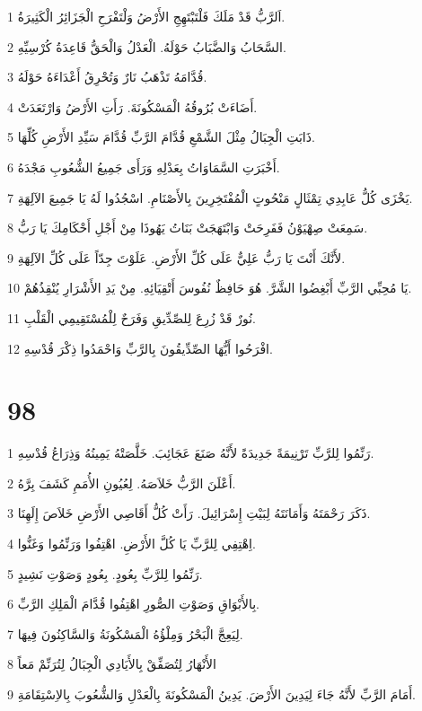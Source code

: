 \par 1 اَلرَّبُّ قَدْ مَلَكَ فَلْتَبْتَهِجِ الأَرْضُ وَلْتَفْرَحِ الْجَزَائِرُ الْكَثِيرَةُ.
\par 2 السَّحَابُ وَالضَّبَابُ حَوْلَهُ. الْعَدْلُ وَالْحَقُّ قَاعِدَةُ كُرْسِيِّهِ.
\par 3 قُدَّامَهُ تَذْهَبُ نَارٌ وَتُحْرِقُ أَعْدَاءَهُ حَوْلَهُ.
\par 4 أَضَاءَتْ بُرُوقُهُ الْمَسْكُونَةَ. رَأَتِ الأَرْضُ وَارْتَعَدَتْ.
\par 5 ذَابَتِ الْجِبَالُ مِثْلَ الشَّمْعِ قُدَّامَ الرَّبِّ قُدَّامَ سَيِّدِ الأَرْضِ كُلِّهَا.
\par 6 أَخْبَرَتِ السَّمَاوَاتُ بِعَدْلِهِ وَرَأَى جَمِيعُ الشُّعُوبِ مَجْدَهُ.
\par 7 يَخْزَى كُلُّ عَابِدِي تِمْثَالٍ مَنْحُوتٍ الْمُفْتَخِرِينَ بِالأَصْنَامِ. اسْجُدُوا لَهُ يَا جَمِيعَ الآلِهَةِ.
\par 8 سَمِعَتْ صِهْيَوْنُ فَفَرِحَتْ وَابْتَهَجَتْ بَنَاتُ يَهُوذَا مِنْ أَجْلِ أَحْكَامِكَ يَا رَبُّ.
\par 9 لأَنَّكَ أَنْتَ يَا رَبُّ عَلِيٌّ عَلَى كُلِّ الأَرْضِ. عَلَوْتَ جِدّاً عَلَى كُلِّ الآلِهَةِ.
\par 10 يَا مُحِبِّي الرَّبِّ أَبْغِضُوا الشَّرَّ. هُوَ حَافِظٌ نُفُوسَ أَتْقِيَائِهِ. مِنْ يَدِ الأَشْرَارِ يُنْقِذُهُمْ.
\par 11 نُورٌ قَدْ زُرِعَ لِلصِّدِّيقِ وَفَرَحٌ لِلْمُسْتَقِيمِي الْقَلْبِ.
\par 12 افْرَحُوا أَيُّهَا الصِّدِّيقُونَ بِالرَّبِّ وَاحْمَدُوا ذِكْرَ قُدْسِهِ.

\chapter{98}

\par 1 رَنِّمُوا لِلرَّبِّ تَرْنِيمَةً جَدِيدَةً لأَنَّهُ صَنَعَ عَجَائِبَ. خَلَّصَتْهُ يَمِينُهُ وَذِرَاعُ قُدْسِهِ.
\par 2 أَعْلَنَ الرَّبُّ خَلاَصَهُ. لِعُيُونِ الأُمَمِ كَشَفَ بِرَّهُ.
\par 3 ذَكَرَ رَحْمَتَهُ وَأَمَانَتَهُ لِبَيْتِ إِسْرَائِيلَ. رَأَتْ كُلُّ أَقَاصِي الأَرْضِ خَلاَصَ إِلَهِنَا.
\par 4 اِهْتِفِي لِلرَّبِّ يَا كُلَّ الأَرْضِ. اهْتِفُوا وَرَنِّمُوا وَغَنُّوا.
\par 5 رَنِّمُوا لِلرَّبِّ بِعُودٍ. بِعُودٍ وَصَوْتِ نَشِيدٍ.
\par 6 بِالأَبْوَاقِ وَصَوْتِ الصُّورِ اهْتِفُوا قُدَّامَ الْمَلِكِ الرَّبِّ.
\par 7 لِيَعِجَّ الْبَحْرُ وَمِلْؤُهُ الْمَسْكُونَةُ وَالسَّاكِنُونَ فِيهَا.
\par 8 الأَنْهَارُ لِتُصَفِّقْ بِالأَيَادِي الْجِبَالُ لِتُرَنِّمْ مَعاً
\par 9 أَمَامَ الرَّبِّ لأَنَّهُ جَاءَ لِيَدِينَ الأَرْضَ. يَدِينُ الْمَسْكُونَةَ بِالْعَدْلِ وَالشُّعُوبَ بِالاِسْتِقَامَةِ.

